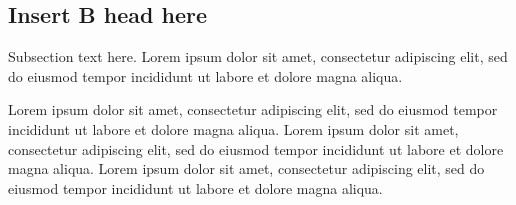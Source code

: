 \subsection{Insert B head here}
Subsection text here. Lorem ipsum\autocite{Bayer_etal_2013} dolor sit amet, consectetur adipiscing elit, sed do eiusmod tempor incididunt ut labore\autocite{Adade_etal_2007} et dolore magna aliqua. 

 Lorem ipsum dolor sit amet, consectetur adipiscing elit, sed do eiusmod tempor incididunt ut labore et dolore magna aliqua. Lorem ipsum dolor sit amet, consectetur adipiscing elit, sed do eiusmod tempor incididunt ut labore et dolore magna aliqua. Lorem ipsum dolor sit amet, consectetur adipiscing elit, sed do eiusmod tempor incididunt ut labore et dolore magna aliqua. 

